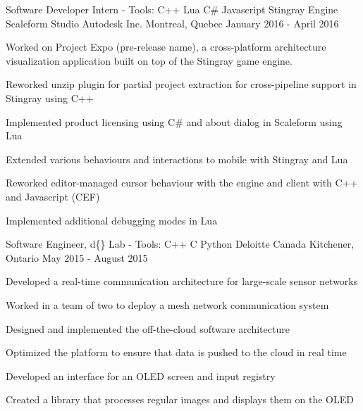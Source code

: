 


\begin{cventries}


\cventry
{Software Developer Intern - Tools: C++ \textbullet{} Lua \textbullet{} C\# \textbullet{} Javascript \textbullet{} Stingray Engine \textbullet{} Scaleform Studio}
{Autodesk Inc.}
{Montreal, Quebec}
{January 2016 - April 2016}
{ %
Worked on Project Expo (pre-release name), a cross-platform architecture visualization application built on top of the Stingray game engine.
\begin{cvitems}
\item[]
\item {Reworked unzip plugin for partial project extraction for cross-pipeline support in Stingray using C++}
\item {Implemented product licensing using C\# and about dialog in Scaleform using Lua}
\item {Extended various behaviours and interactions to mobile with Stingray and Lua}
\item {Reworked editor-managed cursor behaviour with the engine and client with C++ and Javascript (CEF)}
\item {Implemented additional debugging modes in Lua}
\end{cvitems}
}


\cventry
{Software Engineer, d\{\} Lab - Tools: C++ \textbullet{} C \textbullet{} Python}
{Deloitte Canada} %
{Kitchener, Ontario} %
{May 2015 - August 2015} %
{
Developed a real-time communication architecture for large-scale sensor networks
\begin{cvitems}
\item[]
\item {Worked in a team of two to deploy a mesh network communication system}
\item {Designed and implemented the off-the-cloud software architecture}
\item {Optimized the platform to ensure that data is pushed to the cloud in real time}
\item {Developed an interface for an OLED screen and input registry}
\item {Created a library that processes regular images and displays them on the OLED}
\end{cvitems}
}


\end{cventries}

